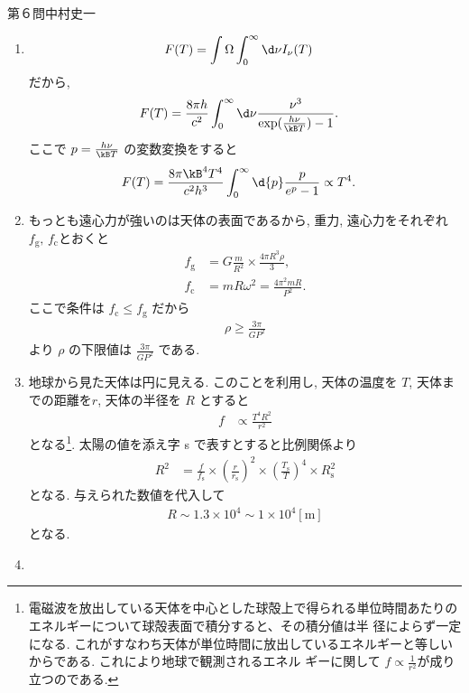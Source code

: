 \begin{answer}{第６問}{中村史一}
\begin{enumerate}
\begin{center}
  \end{center}
\item
  \begin{align}
    F(T) &= \int\Omega\int_0^\infty \d\nu I_\nu(T)
  \end{align}
  だから,
  \begin{align}
    F(T) &= \frac{8\pi h}{c^2} \int_0^\infty \d\nu \frac{\nu^3}{\exp(\frac{h\nu}{\kB T})-1}.
  \end{align}
  ここで $p=\frac{h\nu}{\kB T}$ の変数変換をすると
  \begin{align}
    F(T) &= \frac{8\pi\kB^4T^4}{c^2h^3} \int_0^\infty \d{p} \frac{p}{e^p-1} \propto T^4.
  \end{align}
\item{}
  もっとも遠心力が強いのは天体の表面であるから, 重力, 遠心力をそれぞれ $f_\mathrm{g},\,f_\mathrm{c}$とおくと
  \begin{align}
    f_\mathrm{g} &= G\frac{m}{R^2}\times\frac{4\pi R^3\rho}3,\\
    f_\mathrm{c} &= mR\omega^2 = \frac{4\pi^2mR}{P^2}.
  \end{align}
  ここで条件は $f_\mathrm{c}\le f_\mathrm{g}$ だから
  \begin{align}
    \rho \ge \frac{3\pi}{GP^2}
  \end{align}
  より $\rho$ の下限値は $\frac{3\pi}{GP^2}$ である.
\item
  地球から見た天体は円に見える. このことを利用し, 天体の温度を $T$, 天体までの距離を$r$,
  天体の半径を $R$ とすると
  \begin{align}
    f &\propto \frac{T^4R^2}{r^2}
  \end{align}
  となる\footnote{
  電磁波を放出している天体を中心とした球殻上で得られる単位時間あたりのエネルギーについて球殻表面で積分すると、その積分値は半
  径によらず一定になる. これがすなわち天体が単位時間に放出しているエネルギーと等しいからである. これにより地球で観測されるエネル
  ギーに関して $f\propto \frac1{r^2}$が成り立つのである.}.
  太陽の値を添え字 s で表すとすると比例関係より
  \begin{align}
    R^2 &=\frac{f}{f_\mathrm{s}}\times\left(\frac{r}{r_\mathrm{s}}\right)^2\times\left(\frac{T_\mathrm{s}}{T}\right)^4\times R_\mathrm{s}^2
  \end{align}
  となる. 与えられた数値を代入して
  \begin{align}
    R \sim 1.3\times10^4\sim 1\times 10^4[\mathrm{m}]
  \end{align}
  となる.
\item

\end{enumerate}
\end{answer}
